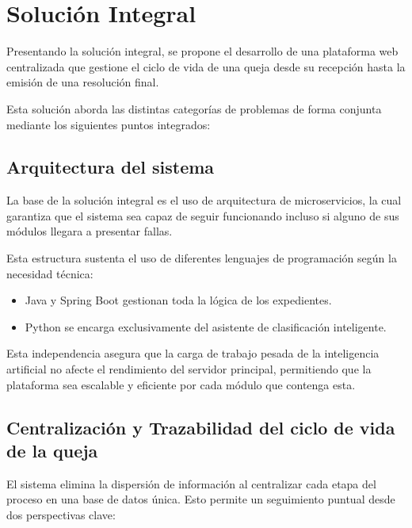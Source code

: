 \section{Solución Integral}

\begin{flushleft}
\justifying

Presentando la solución integral, se propone el desarrollo de una plataforma web centralizada que gestione el ciclo de vida de una queja desde su recepción hasta la emisión de una resolución final.

Esta solución aborda las distintas categorías de problemas de forma conjunta mediante los siguientes puntos integrados:

\subsection{Arquitectura del sistema}

La base de la solución integral es el uso de arquitectura de microservicios, la cual garantiza que el sistema sea capaz de seguir funcionando incluso si alguno de sus módulos llegara a presentar fallas.

Esta estructura sustenta el uso de diferentes lenguajes de programación según la necesidad técnica:

\begin{itemize}
    \item Java y Spring Boot gestionan toda la lógica de los expedientes.
    \item Python se encarga exclusivamente del asistente de clasificación inteligente.
\end{itemize}

Esta independencia asegura que la carga de trabajo pesada de la inteligencia artificial no afecte el rendimiento del servidor principal, permitiendo que la plataforma sea escalable y eficiente por cada módulo que contenga esta.

\subsection{Centralización y Trazabilidad del ciclo de vida de la queja}

El sistema elimina la dispersión de información al centralizar cada etapa del proceso en una base de datos única. Esto permite un seguimiento puntual desde dos perspectivas clave:


\end{flushleft}
